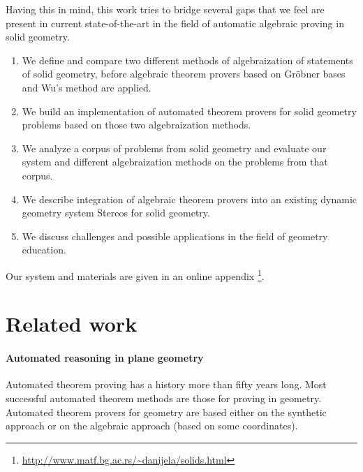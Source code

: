 \documentclass[final,1p,times,authoryear]{elsarticle}
\begin{document}
Having this in mind, this work tries to bridge several gaps that we
feel are present in current state-of-the-art in the field of automatic
algebraic proving in solid geometry.
\begin{enumerate}
\item We define and compare two different methods of algebraization of
  statements of solid geometry, before algebraic theorem provers based
  on Gr\"obner bases and Wu's method are applied.

\item We build an implementation of automated theorem provers for
  solid geometry problems based on those two algebraization methods.

\item We analyze a corpus of problems from solid geometry and evaluate
  our system and different algebraization methods on the problems from
  that corpus.

\item We describe integration of algebraic theorem provers into an
  existing dynamic geometry system Stereos for solid geometry.

\item We discuss challenges and possible applications in the field of
  geometry education.
\end{enumerate}

Our system and materials are given in an online
appendix \footnote{\url{http://www.matf.bg.ac.rs/~danijela/solids.html}}.


\section{Related work}
\paragraph{Automated reasoning in plane geometry}
Automated theorem proving has a history more than fifty years
long. Most successful automated theorem methods are those for proving
in geometry. Automated theorem provers for geometry are based either
on the synthetic approach or on the algebraic approach (based on some
coordinates).
\end{document}
